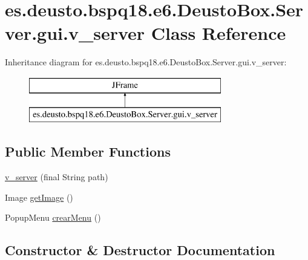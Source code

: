 \hypertarget{classes_1_1deusto_1_1bspq18_1_1e6_1_1_deusto_box_1_1_server_1_1gui_1_1v__server}{}\section{es.\+deusto.\+bspq18.\+e6.\+Deusto\+Box.\+Server.\+gui.\+v\+\_\+server Class Reference}
\label{classes_1_1deusto_1_1bspq18_1_1e6_1_1_deusto_box_1_1_server_1_1gui_1_1v__server}
Inheritance diagram for es.\+deusto.\+bspq18.\+e6.\+Deusto\+Box.\+Server.\+gui.\+v\+\_\+server\+:\begin{figure}[H]
\begin{center}
\leavevmode
\includegraphics[height=2.000000cm]{classes_1_1deusto_1_1bspq18_1_1e6_1_1_deusto_box_1_1_server_1_1gui_1_1v__server}
\end{center}
\end{figure}
\subsection*{Public Member Functions}
\begin{DoxyCompactItemize}
\item 
\mbox{\hyperlink{classes_1_1deusto_1_1bspq18_1_1e6_1_1_deusto_box_1_1_server_1_1gui_1_1v__server_a7ba17ad56573d62dbb26e56cd1c38a07}{v\+\_\+server}} (final String path)
\item 
Image \mbox{\hyperlink{classes_1_1deusto_1_1bspq18_1_1e6_1_1_deusto_box_1_1_server_1_1gui_1_1v__server_af2ff245fae814f865c4ce6b22adfbaf6}{get\+Image}} ()
\item 
Popup\+Menu \mbox{\hyperlink{classes_1_1deusto_1_1bspq18_1_1e6_1_1_deusto_box_1_1_server_1_1gui_1_1v__server_af312d94be56a2a00c5ea5fd8bde7079f}{crear\+Menu}} ()
\end{DoxyCompactItemize}


\subsection{Constructor \& Destructor Documentation}
\mbox{\label{classes_1_1deusto_1_1bspq18_1_1e6_1_1_deusto_box_1_1_server_1_1gui_1_1v__server_a7ba17ad56573d62dbb26e56cd1c38a07}} 
